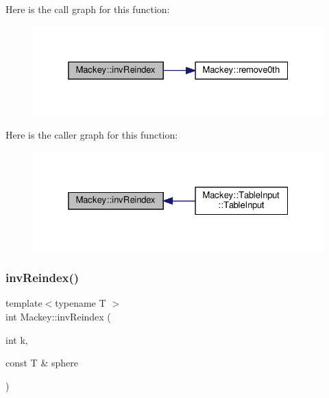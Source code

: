 Here is the call graph for this function\+:\nopagebreak
\begin{figure}[H]
\begin{center}
\leavevmode
\includegraphics[width=325pt]{namespaceMackey_a5efb3695c450e4e590b86f20700f726b_cgraph}
\end{center}
\end{figure}
Here is the caller graph for this function\+:\nopagebreak
\begin{figure}[H]
\begin{center}
\leavevmode
\includegraphics[width=325pt]{namespaceMackey_a5efb3695c450e4e590b86f20700f726b_icgraph}
\end{center}
\end{figure}
\mbox{\label{namespaceMackey_a011b8e23bc2eedf751a9ce7bdc9e4cb9}} 
\subsubsection{\texorpdfstring{inv\+Reindex()}{invReindex()}\hspace{0.1cm}{\footnotesize\ttfamily [2/2]}}
{\footnotesize\ttfamily template$<$typename T $>$ \\
int Mackey\+::inv\+Reindex (\begin{DoxyParamCaption}\item[{int}]{k,  }\item[{const T \&}]{sphere }\end{DoxyParamCaption})\hspace{0.3cm}{\ttfamily [inline]}}



